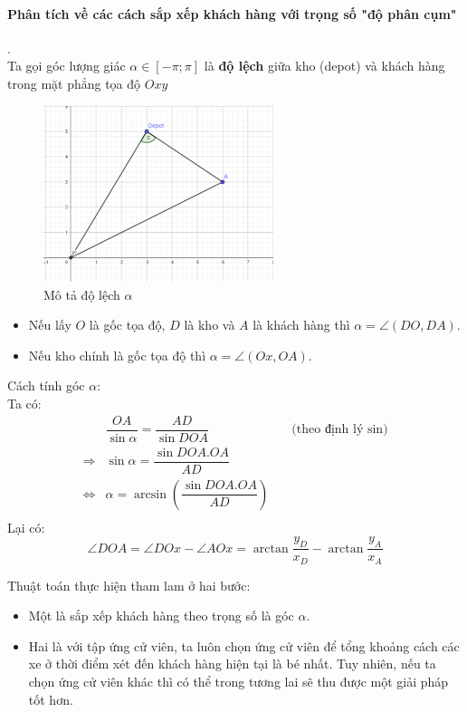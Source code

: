 \documentclass[12pt,a4paper]{article}\author{Nguyễn Nho Dũng}
\newcommand{\kniem}[1]{{\sffamily\bfseries #1}}
\newcommand{\doan}[2]{\left[#1;#2\right]}
\newcommand{\ngoacto}[1]{\left(#1\right)}
\begin{document}
\paragraph*{Phân tích về các cách sắp xếp khách hàng với trọng số "độ phân cụm"}.\\
Ta gọi góc lượng giác $\alpha\in\doan{-\pi}{\pi}$ là \kniem{độ lệch} giữa kho (depot) và khách hàng trong mặt phẳng tọa độ $Oxy$
\begin{figure}[H]
	\centering
	\includegraphics[width=0.6\textwidth]{Anh/minhhoa_thamlam}
	\caption{Mô tả độ lệch $\alpha$}
\end{figure}
\begin{itemize}
	\item Nếu lấy $O$ là gốc tọa độ, $D$ là kho và $A$ là khách hàng thì $\alpha = \angle\ngoacto{DO, DA}$.
	\item Nếu kho chính là gốc tọa độ thì $\alpha = \angle\ngoacto{Ox, OA}$.
\end{itemize}
Cách tính góc $\alpha$:\\
Ta có:
\begin{align*}
    &\dfrac{OA}{\sin\alpha} = \dfrac{AD}{\sin DOA}&\quad\text{(theo định lý $\sin$)}\\
    \Rightarrow& \sin\alpha = \dfrac{\sin DOA. OA}{AD}&\\
    \Leftrightarrow& \alpha = \arcsin\ngoacto{\dfrac{\sin DOA. OA}{AD}}&\\
\end{align*}
Lại có: $$\angle DOA = \angle DOx - \angle AOx= \arctan\dfrac{y_D}{x_D}-\arctan\dfrac{y_A}{x_A}$$



Thuật toán thực hiện tham lam ở hai bước: 
\begin{itemize}
	\item Một là sắp xếp khách hàng theo trọng số là góc $\alpha$.
	\item Hai là với tập ứng cử viên, ta luôn chọn ứng cử viên để tổng khoảng cách các xe ở thời điểm xét đến khách hàng hiện tại là bé nhất. Tuy nhiên, nếu ta chọn ứng cử viên khác thì có thể trong tương lai sẽ thu được một giải pháp tốt hơn.
\end{itemize}
\end{document}
